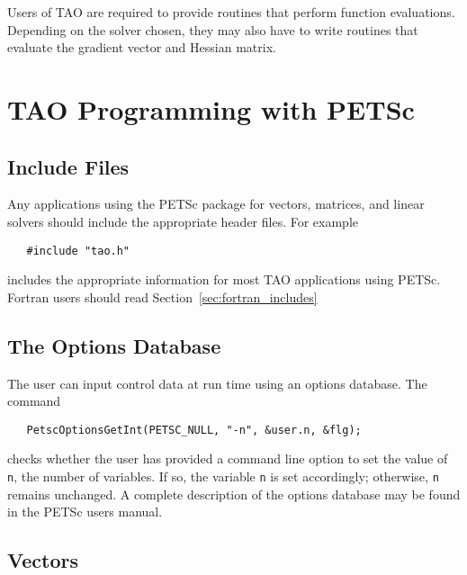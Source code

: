Users of TAO are required to provide routines that perform function
evaluations. Depending on the solver chosen, they may also have to
write routines that evaluate the gradient vector and Hessian matrix.

\section{TAO Programming with PETSc}
\label{sec:tao_programming}

\subsection*{Include Files}
Any applications using the PETSc package for vectors, matrices, and linear
solvers should include the appropriate header files.  For example
\begin{verbatim}
   #include "tao.h"
\end{verbatim}
\noindent
includes the appropriate information for most TAO applications using PETSc. 
Fortran users should read Section~\ref{sec:fortran_includes}


\subsection*{The Options Database}
\label{sec:options}

The user can input control data at run time using an options database.
The command
\begin{verbatim}
   PetscOptionsGetInt(PETSC_NULL, "-n", &user.n, &flg);
\end{verbatim}
\noindent
checks whether
the user has provided a command line option to set the value of \texttt{
n}, the number of variables.  If so, the variable \texttt{n} is set
accordingly; otherwise, \texttt{n} remains unchanged. A complete
description of the options database may be found in the PETSc users
manual.

\subsection*{Vectors}


